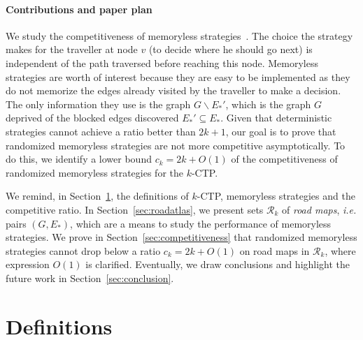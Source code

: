 \documentclass[preprint]{elsarticle}
\newcommand{\kctp}{$k$-CTP}
\begin{document}
\paragraph{Contributions and paper plan}
We study the competitiveness of memoryless strategies~\cite{Al03,BoEl98}. The choice the strategy makes for the traveller at node $v$ (to decide where he should go next) is independent of the path traversed before reaching this node. Memoryless strategies are worth of interest because they are easy to be implemented as they do not memorize the edges already visited by the traveller to make a decision. The only information they use is the graph $G\backslash E_*'$, which is the graph $G$ deprived of the blocked edges discovered $E_*' \subseteq E_*$.
Given that deterministic strategies cannot achieve a ratio better than $2k+1$, our goal is to prove that randomized memoryless strategies are not more competitive asymptotically. To do this, we identify a lower bound $c_k = 2k + O\left(1\right)$ of the competitiveness of randomized memoryless strategies for the \kctp.

We remind, in Section~\ref{sec:def}, the definitions of \kctp , memoryless strategies and the competitive ratio.
In Section~\ref{sec:roadatlas}, we present sets $\mathcal{R}_k$ of \textit{road maps}, {\em i.e.} pairs $\left(G,E_*\right)$, which are a means to study the performance of memoryless strategies.
We prove in Section~\ref{sec:competitiveness} that randomized memoryless strategies cannot drop below a ratio $c_k = 2k+O\left(1\right)$ on road maps in $\mathcal{R}_k$, where expression $O\left(1\right)$ is clarified.
Eventually, we draw conclusions and highlight the future work in Section~\ref{sec:conclusion}.
\section{Definitions} \label{sec:def}
\end{document}
